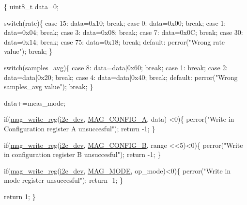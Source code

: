 \begin{DoxyCode}
\{ 
  uint8\_t data=0;

  \textcolor{keywordflow}{switch}(rate)\{
    \textcolor{keywordflow}{case} 15:
      data=0x10;
      \textcolor{keywordflow}{break};
    \textcolor{keywordflow}{case} 0:
      data=0x00;
      \textcolor{keywordflow}{break};
    \textcolor{keywordflow}{case} 1:
      data=0x04;
      \textcolor{keywordflow}{break};
    \textcolor{keywordflow}{case} 3:
      data=0x08;
      \textcolor{keywordflow}{break};
    \textcolor{keywordflow}{case} 7:
      data=0x0C;
      \textcolor{keywordflow}{break};
    \textcolor{keywordflow}{case} 30:
      data=0x14;
      \textcolor{keywordflow}{break};
    \textcolor{keywordflow}{case} 75:
      data=0x18;
      \textcolor{keywordflow}{break};
    \textcolor{keywordflow}{default}:
      perror(\textcolor{stringliteral}{"Wrong rate value"});
      \textcolor{keywordflow}{break};
  \}
  
  \textcolor{keywordflow}{switch}(samples\_avg)\{
    \textcolor{keywordflow}{case} 8:
      data=data|0x60;
      \textcolor{keywordflow}{break};
    \textcolor{keywordflow}{case} 1:
      \textcolor{keywordflow}{break};
    \textcolor{keywordflow}{case} 2:
      data=data|0x20;
      \textcolor{keywordflow}{break};
    \textcolor{keywordflow}{case} 4:
      data=data|0x40;
      \textcolor{keywordflow}{break};
    \textcolor{keywordflow}{default}:
      perror(\textcolor{stringliteral}{"Wrong samples\_avg value"});
      \textcolor{keywordflow}{break};
  \}
  
  data+=meas\_mode;
  
  \textcolor{keywordflow}{if}(\hyperlink{group__mag_gab5d0ae421cd4bb10b1b7a1eda167416b}{mag\_write\_reg}(\hyperlink{CommunicationV0_2communication_8c_a7751bd45ac1064efb35adf1f19c25db8}{i2c\_dev}, \hyperlink{communication_2imu__regs_8h_a4c80cd6ce866f16a3d999ee2c5635ec9}{MAG\_CONFIG\_A}, data)
      <0)\{
    perror(\textcolor{stringliteral}{"Write in Configuration register A unsuccesful"});
    \textcolor{keywordflow}{return} -1;
  \}
  
  \textcolor{keywordflow}{if}(\hyperlink{group__mag_gab5d0ae421cd4bb10b1b7a1eda167416b}{mag\_write\_reg}(\hyperlink{CommunicationV0_2communication_8c_a7751bd45ac1064efb35adf1f19c25db8}{i2c\_dev}, \hyperlink{communication_2imu__regs_8h_a094173f77219df894d97eed44405d942}{MAG\_CONFIG\_B}, range
      <<5)<0)\{
    perror(\textcolor{stringliteral}{"Write in configuration register B unsuccesful"});
    \textcolor{keywordflow}{return} -1;
  \}
  
  \textcolor{keywordflow}{if}(\hyperlink{group__mag_gab5d0ae421cd4bb10b1b7a1eda167416b}{mag\_write\_reg}(\hyperlink{CommunicationV0_2communication_8c_a7751bd45ac1064efb35adf1f19c25db8}{i2c\_dev}, \hyperlink{communication_2imu__regs_8h_a0173afba6efc0e164495bf506a9758d2}{MAG\_MODE}, op\_mode)<0)\{
    perror(\textcolor{stringliteral}{"Write in mode register unsuccesful"});
    \textcolor{keywordflow}{return} -1;
  \}
  
  \textcolor{keywordflow}{return} 1;
\}
\end{DoxyCode}


